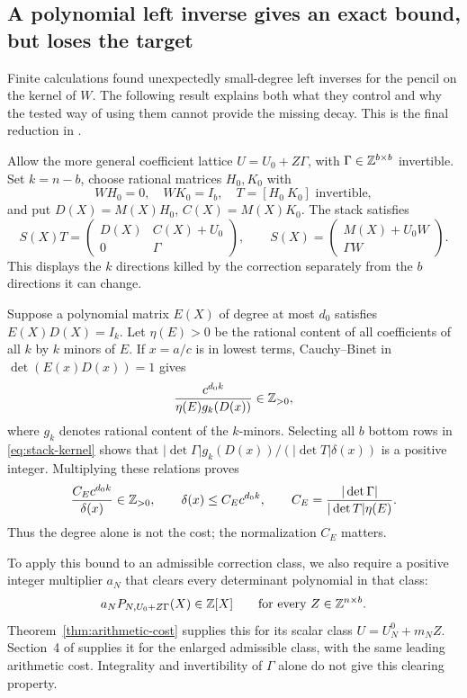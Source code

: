 \subsection{A polynomial left inverse gives an exact bound, but loses the target}\label{subsec:kernel-inverse}

Finite calculations found unexpectedly small-degree left inverses for
the pencil on the kernel of $W$. The following result explains both
what they control and why the tested way of using them cannot provide
the missing decay. This is the final reduction in .

Allow the more general coefficient lattice $U=U_0+Z\Gamma$, with
$\Gamma\in\mathbb Z^{b\times b}$ invertible. Set $k=n-b$, choose rational
matrices $H_0,K_0$ with
\[
 WH_0=0,\quad WK_0=I_b,\quad T=[H_0\ K_0]\text{ invertible},
\]
and put $D(X)=M(X)H_0$, $C(X)=M(X)K_0$. The stack satisfies
\begin{equation}\label{eq:stack-kernel}
 S(X)T=
 \begin{pmatrix}D(X)&C(X)+U_0\\0&\Gamma\end{pmatrix},
 \qquad S(X)=\begin{pmatrix}M(X)+U_0W\\\Gamma W\end{pmatrix}.
\end{equation}
This displays the $k$ directions killed by the correction separately
from the $b$ directions it can change.

Suppose a polynomial matrix $E(X)$ of degree at most $d_0$ satisfies
$E(X)D(X)=I_k$. Let $\eta(E)>0$ be the rational content of all
coefficients of all $k$ by $k$ minors of $E$. If $x=a/c$ is in lowest
terms, Cauchy--Binet in $\det(E(x)D(x))=1$ gives
\[
 \frac{c^{d_0k}}{\eta(E)g_k(D(x))}\in\mathbb Z_{>0},
\]
where $g_k$ denotes rational content of the $k$-minors. Selecting all
$b$ bottom rows in \eqref{eq:stack-kernel} shows that
$|\det\Gamma|g_k(D(x))/(|\det T|\delta(x))$ is a positive integer.
Multiplying these relations proves
\begin{equation}\label{eq:inverse-content}
 \frac{C_Ec^{d_0k}}{\delta(x)}\in\mathbb Z_{>0},\qquad
 \delta(x)\le C_Ec^{d_0k},\qquad
 C_E=\frac{|\det\Gamma|}{|\det T|\eta(E)}.
\end{equation}
Thus the degree alone is not the cost; the normalization $C_E$ matters.

To apply this bound to an admissible correction class, we also require
a positive integer multiplier $a_N$ that clears every determinant polynomial
in that class:
\[
 a_NP_{N,U_0+Z\Gamma}(X)\in\mathbb Z[X]
 \qquad\text{for every }Z\in\mathbb Z^{n\times b}.
\]
Theorem~\ref{thm:arithmetic-cost} supplies this for its scalar class
$U=U_N^0+m_NZ$. Section~4 of  supplies it for the enlarged
admissible class, with the same leading arithmetic cost. Integrality
and invertibility of $\Gamma$ alone do not give this clearing property.

